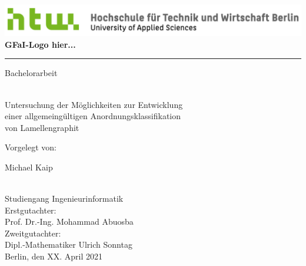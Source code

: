 \documentclass[
fontsize=10pt, 
listof = totoc,
parskip = half	
]{report}
\author{Michael Kaip}
\date{}
\begin{document}
	\begin{titlepage}
		\vspace*{-\headsep}\vspace{-\headheight}
		\noindent
		\includegraphics[scale=0.38]{logo}
		\hfill
		\textbf{GFaI-Logo hier...}\\[-1ex]
		\rule{\linewidth}{1pt}
		
		\vfill\vfill
		
		\begin{center}
			Bachelorarbeit
			\begin{huge}
				\\[2ex]
				Untersuchung der Möglichkeiten zur Entwicklung \\ einer allgemeingültigen Anordnungsklassifikation \\ von Lamellengraphit
				\\[6ex]
			\end{huge}
			Vorgelegt von:
			\\[2ex]
			\begin{huge}
				Michael Kaip
			\end{huge}
			\\[2ex]
			Studiengang Ingenieurinformatik
			\\[28ex]
			Erstgutachter:
			\\[2ex]
			Prof. Dr.-Ing. Mohammad Abuosba
			\\[4ex]
			Zweitgutachter:
			\\[2ex]
			Dipl.-Mathematiker Ulrich Sonntag
			\\[40ex]
			Berlin, den XX. April 2021
		\end{center}
	

	\end{titlepage}
	
\clearpage

\begingroup
\pagestyle{empty}
\null
\newpage
\endgroup


\begin{abstract}
	\lipsum[1-4]   
\end{abstract}

\newpage
\tableofcontents
\newpage
{}
\listoffigures
{}
\newpage
\listoftables
{}
\newpage
{}
\newpage
\end{document}
